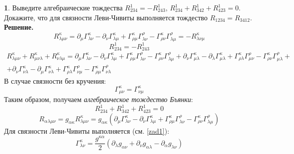 \documentclass[12pt]{article}
\theoremstyle{definition}
\newtheorem{zad}{}[section]
\begin{document}
\begin{zad}
Выведите алгебраические тождества $R^1_{234}=-R^1_{243}$, $R^1_{234}+R^1_{342}+R^1_{423}=0$. Докажите, что для связности Леви-Чивиты выполняется тождество $R_{1234}=R_{3412}$.\\
\textbf{Решение.}\\
\begin{equation}
    R^\kappa_{\lambda\mu\nu}=\partial_\mu\Gamma^\kappa_{\lambda\nu}-\partial_\nu\Gamma^\kappa_{\lambda\mu}+\Gamma^\kappa_{\rho\mu}\Gamma^\rho_{\lambda\nu}-\Gamma^\kappa_{\rho\nu}\Gamma^\rho_{\lambda\mu}=-R^\kappa_{\lambda\nu\mu}
\end{equation}
\begin{equation}
    \boxed{R^1_{234}=-R^1_{243}}
\end{equation}
\begin{multline}
    R^\kappa_{\lambda\mu\nu}+R^\kappa_{\mu\nu\lambda}+R^\kappa_{\nu\lambda\mu}=\partial_\mu\Gamma^\kappa_{\lambda\nu}-\partial_\nu\Gamma^\kappa_{\lambda\mu}+\Gamma^\kappa_{\rho\mu}\Gamma^\rho_{\lambda\nu}-\Gamma^\kappa_{\rho\nu}\Gamma^\rho_{\lambda\mu}+
    \partial_\nu\Gamma^\kappa_{\mu\lambda}-\partial_\lambda\Gamma^\kappa_{\mu\lambda}+\Gamma^\kappa_{\rho\lambda}\Gamma^\rho_{\mu\nu}-\Gamma^\kappa_{\rho\nu}\Gamma^\rho_{\mu\lambda}+\\+\partial_\nu\Gamma^\kappa_{\nu\lambda}-\partial_\mu\Gamma^\kappa_{\nu\lambda}+\Gamma^\kappa_{\rho\lambda}\Gamma^\rho_{\nu\mu}-\Gamma^\kappa_{\rho\mu}\Gamma^\rho_{\nu\lambda}
\end{multline}
В случае связности без кручения:
\begin{equation}
    \Gamma^\kappa_{\mu\nu}=\Gamma^\kappa_{\nu\mu}
\end{equation}
Таким образом, получаем \textit{алгебраическое тождество Бъянки}:
\begin{equation}
    \boxed{R^1_{234}+R^1_{342}+R^1_{423}=0}
\end{equation}
\begin{equation}
    R_{\alpha\lambda\mu\nu}=g_{\alpha\kappa}R^\kappa_{\lambda\mu\nu}=g_{\alpha\kappa}(\partial_\mu\Gamma^\kappa_{\lambda\nu}-\partial_\nu\Gamma^\kappa_{\lambda\mu}+\Gamma^\kappa_{\rho\mu}\Gamma^\rho_{\lambda\nu}-\Gamma^\kappa_{\rho\nu}\Gamma^\rho_{\lambda\mu})
\end{equation}
Для связности Леви-Чивиты выполняется (см. \ref{zad1}):
\begin{equation}
    \Gamma^\kappa_{\lambda\nu}=\frac{g^{\kappa\alpha}}{2}(\partial_\lambda g_{\alpha\nu}+\partial_\nu g_{\alpha\lambda}-\partial_\alpha g_{\lambda\nu})

\end{equation}
\end{zad}
\end{document}
